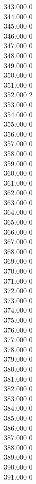 { 343.000	0 \\
 344.000	0 \\
 345.000	0 \\
 346.000	0 \\
 347.000	0 \\
 348.000	0 \\
 349.000	0 \\
 350.000	0 \\
 351.000	0 \\
 352.000	2 \\
 353.000	0 \\
 354.000	0 \\
 355.000	0 \\
 356.000	0 \\
 357.000	0 \\
 358.000	0 \\
 359.000	0 \\
 360.000	0 \\
 361.000	0 \\
 362.000	0 \\
 363.000	0 \\
 364.000	0 \\
 365.000	0 \\
 366.000	0 \\
 367.000	0 \\
 368.000	0 \\
 369.000	0 \\
 370.000	0 \\
 371.000	0 \\
 372.000	0 \\
 373.000	0 \\
 374.000	0 \\
 375.000	0 \\
 376.000	0 \\
 377.000	0 \\
 378.000	0 \\
 379.000	0 \\
 380.000	0 \\
 381.000	0 \\
 382.000	0 \\
 383.000	0 \\
 384.000	0 \\
 385.000	0 \\
 386.000	0 \\
 387.000	0 \\
 388.000	0 \\
 389.000	0 \\
 390.000	0 \\
 391.000	0 \\
}
